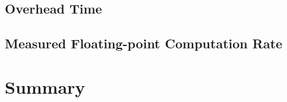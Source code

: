\documentclass[10pt]{article}
\begin{document}
\subsection{Overhead Time}
\subsection{Measured Floating-point Computation Rate}
\section{Summary}



\end{document}
